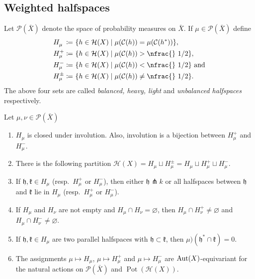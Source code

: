 \subsection{Weighted halfspaces}
\label{sec:weight}

\begin{defin}
  Let \(\mathcal{P}(\bar X)\) denote the space of probability measures on \(\bar X\). If \(\mu \in \mathcal{P}(\bar X)\) define
  \begin{align*}
    H_\mu^{\phantom{+}} \coloneqq &\ \{h \in \mathcal{H}(X) \mid \mu(\mathcal{C}(h)) = \mu(\mathcal{C}(h^\ast))\},\\
    H_\mu^+ \coloneqq &\ \{h \in \mathcal{H}(X) \mid \mu(\mathcal{C}(h)) > \text{\nfrac{} 1/2} \},\\
    H_\mu^- \coloneqq &\ \{h \in \mathcal{H}(X) \mid \mu(\mathcal{C}(h)) < \text{\nfrac{} 1/2}\} \text{ and}\\
    H_\mu^\pm \coloneqq &\ \{h \in \mathcal{H}(X) \mid \mu(\mathcal{C}(h)) \neq \text{\nfrac{} 1/2}\}.
  \end{align*} 
  The above four sets are called \emph{balanced, heavy, light} and \emph{unbalanced halfspaces} respectively.
\end{defin}

\begin{lemma}[{\cite[Lem.\ 4.6]{MR3509968}}]
  \label{lem:4.6}
  Let \(\mu,\nu \in \mathcal{P}(\bar X)\)
  \begin{enumerate}
  \item \(H_\mu\) is closed under involution. Also, involution is a bijection between \(H_\mu^+\) and \(H_\mu^-\).
  \item There is the following partition \(\mathcal{H}(X) = H_\mu \sqcup H_\mu^\pm = H_\mu \sqcup H_\mu^+ \sqcup H_\mu^-\).
  \item If \(\mathfrak{h, k} \in H_\mu\) (resp.\ \(H_\mu^+\) or \(H_\mu^-\)), then either \(\mathfrak{h} \pitchfork k\) or all halfspaces between \(\mathfrak{h}\) and \(\mathfrak{k}\) lie in \(H_\mu\) (resp.\ \(H_\mu^+\) or \(H_\mu^-\)).
  \item If \(H_\mu\) and \(H_\nu\) are not empty and \(H_\mu \cap H_\nu = \varnothing\), then \(H_\mu \cap H_\nu^+ \neq \varnothing\) and \(H_\mu \cap H_\nu^- \neq \varnothing\).
  \item If \(\mathfrak{h, k}  \in H_\mu\) are two parallel halfspaces with \(\mathfrak{h} \subset \mathfrak{k}\), then \(\mu)(\mathfrak{h}^\ast \cap \mathfrak{k}) = 0\).
  \item The assignments \(\mu \mapsto H_\mu\), \(\mu \mapsto H_\mu^+\) and \(\mu \mapsto H_\mu^-\) are \(\operatorname{Aut}(X)\)-equivariant for the natural actions on \(\mathcal{P}(\bar X)\) and \(\operatorname{Pot}(\mathcal{H}(X))\).
  \end{enumerate}
\end{lemma}

